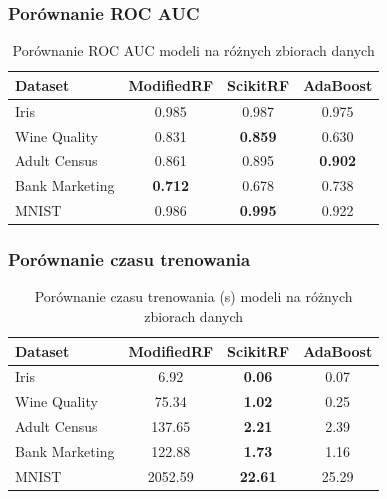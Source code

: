 \documentclass[11pt,a4paper]{article}
\begin{document}
\subsubsection{Porównanie ROC AUC}

\begin{table}[H]
\centering
\caption{Porównanie ROC AUC modeli na różnych zbiorach danych}
\label{tab:roc_auc_comparison}
\begin{tabular}{lccc}
\toprule
Dataset & ModifiedRF & ScikitRF & AdaBoost \\
\midrule
Iris & 0.985 & 0.987 & 0.975 \\
Wine Quality & 0.831 & \textbf{0.859} & 0.630 \\
Adult Census & 0.861 & 0.895 & \textbf{0.902} \\
Bank Marketing & \textbf{0.712} & 0.678 & 0.738 \\
MNIST & 0.986 & \textbf{0.995} & 0.922 \\
\bottomrule
\end{tabular}
\end{table}

\subsubsection{Porównanie czasu trenowania}

\begin{table}[H]
\centering
\caption{Porównanie czasu trenowania (s) modeli na różnych zbiorach danych}
\label{tab:fit_time_comparison}
\begin{tabular}{lccc}
\toprule
Dataset & ModifiedRF & ScikitRF & AdaBoost \\
\midrule
Iris & 6.92 & \textbf{0.06} & 0.07 \\
Wine Quality & 75.34 & \textbf{1.02} & 0.25 \\
Adult Census & 137.65 & \textbf{2.21} & 2.39 \\
Bank Marketing & 122.88 & \textbf{1.73} & 1.16 \\
MNIST & 2052.59 & \textbf{22.61} & 25.29 \\
\bottomrule
\end{tabular}
\end{table}
\end{document}
